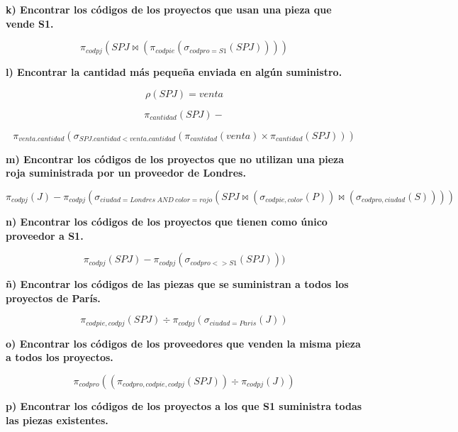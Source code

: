 \documentclass[a4paper,11pt]{article}
\begin{document}
\textbf{k) Encontrar los códigos de los proyectos que usan una pieza que vende S1.}

\begin{equation*}
\pi_{codpj}(SPJ\Join(\pi_{codpie}(\sigma_{codpro=S1}(SPJ))))
\end{equation*}

\textbf{l) Encontrar la cantidad más pequeña enviada en algún suministro.}

\begin{equation*}
\rho(SPJ)=venta
\end{equation*}

\begin{equation*}
\pi_{cantidad}(SPJ) -
\end{equation*}

\begin{equation*}
\pi_{venta.cantidad}(\sigma_{SPJ.cantidad < venta.cantidad}(\pi_{cantidad}(venta)\times \pi_{cantidad}(SPJ)))
\end{equation*}

\textbf{m) Encontrar los códigos de los proyectos que no utilizan una pieza roja suministrada por un proveedor de Londres.}

\begin{equation*}
\pi_{codpj}(J)-\pi_{codpj}(\sigma_{ciudad=Londres \> AND \> color=rojo}(SPJ\Join(\sigma_{codpie,color}(P))\Join(\sigma_{codpro,ciudad}(S))))
\end{equation*}

\textbf{n) Encontrar los códigos de los proyectos que tienen como único proveedor a S1.}

\begin{equation*}
\pi_{codpj}(SPJ)-\pi_{codpj}(\sigma_{codpro<>S1}(SPJ)))
\end{equation*}

\textbf{ñ) Encontrar los códigos de las piezas que se suministran a todos los proyectos de
París.}

\begin{equation*}
\pi_{codpie,codpj}(SPJ) \div \pi_{codpj}(\sigma_{ciudad=Paris}(J))
\end{equation*}

\textbf{o) Encontrar los códigos de los proveedores que venden la misma pieza a todos los
proyectos.}

\begin{equation*}
\pi_{codpro}((\pi_{codpro,codpie,codpj}(SPJ))\div \pi_{codpj}(J))
\end{equation*}

\textbf{p) Encontrar los códigos de los proyectos a los que S1 suministra todas las piezas
existentes.}
\end{document}

